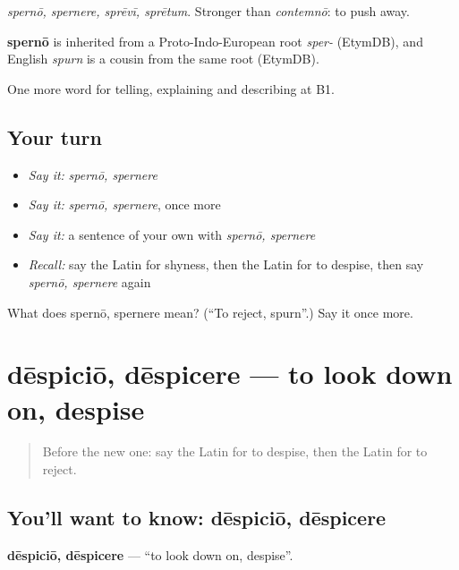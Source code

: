 \emph{spernō, spernere, sprēvī, sprētum}. Stronger than \emph{contemnō}: to push away.

\begin{cousinweb}
\textbf{spernō} is inherited from a Proto-Indo-European root \emph{sper-} (EtymDB), and English \emph{spurn} is a cousin from the same root (EtymDB).
\end{cousinweb}

\begin{grammarlens}[title={What you've built}]
One more word for telling, explaining and describing at B1.
\end{grammarlens}

\subsection*{Your turn}
\begin{itemize}
\raggedright
  \item \emph{Say it:} \emph{spernō, spernere}
  \item \emph{Say it:} \emph{spernō, spernere}, once more
  \item \emph{Say it:} a sentence of your own with \emph{spernō, spernere}
  \item \emph{Recall:} say the Latin for shyness, then the Latin for to despise, then say \emph{spernō, spernere} again
\end{itemize}

\begin{tcolorbox}[breakable,colback=teal!4,colframe=teal!35!black,title={Before you move on}]
What does spernō, spernere mean? (\textquotedblleft{}To reject, spurn\textquotedblright{}.) Say it once more.
\end{tcolorbox}
\section[dēspiciō, dēspicere]{dēspiciō, dēspicere — to look down on, despise}

\label{lesson:LA-C514-despicio}



\begin{quote}
Before the new one: say the Latin for to despise, then the Latin for to reject.
\end{quote}

\subsection*{You'll want to know: dēspiciō, dēspicere}
\textbf{dēspiciō, dēspicere} — \textquotedblleft{}to look down on, despise\textquotedblright{}.

